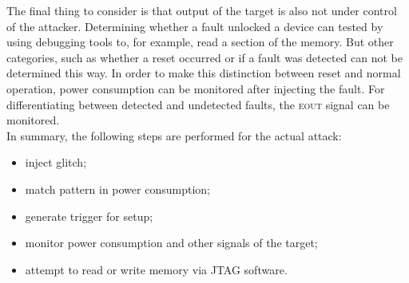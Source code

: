 \documentclass[10pt]{article}
\newcommand{\errorpin}{\textsc{eout}\xspace}
\begin{document}
      The final thing to consider is that output of the target is also not under control of the attacker. Determining whether a fault unlocked a device can tested by using debugging tools to, for example, read a section of the memory. But other categories, such as whether a reset occurred or if a fault was detected can not be determined this way. In order to make this distinction between reset and normal operation, power consumption can be monitored after injecting the fault. For differentiating between detected and undetected faults, the \errorpin signal can be monitored. \\

      \noindent In summary, the following steps are performed for the actual attack: 
      \begin{itemize}
        \item[]{inject glitch;}
        \item[]{match pattern in power consumption;}
        \item[]{generate trigger for setup;}
        \item[]{monitor power consumption and other signals of the target;}
        \item[]{attempt to read or write memory via JTAG software.}
      \end{itemize}
\end{document}
